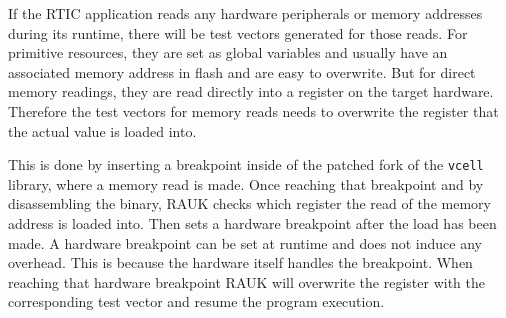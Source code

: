 %
%
%
%
%

If the RTIC application reads any hardware peripherals or memory addresses
during its runtime, there will be test vectors generated for those reads. For
primitive resources, they are set as global variables and usually have an
associated memory address in flash and are easy to overwrite. But for direct
memory readings, they are read directly into a register on the target hardware.
Therefore the test vectors for memory reads needs to overwrite the register
that the actual value is loaded into.

This is done by inserting a breakpoint inside
of the patched fork of the \texttt{vcell} library, where a memory read is made.
Once reaching that breakpoint and by disassembling the binary, RAUK checks
which register the read of the memory address is loaded into. Then sets a
hardware breakpoint after the load has been made. A hardware breakpoint
can be set at runtime and does not induce any overhead. This is because the
hardware itself handles the breakpoint. When reaching that hardware breakpoint
RAUK will overwrite the register with the corresponding test vector and resume
the program execution.

